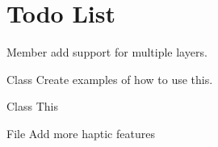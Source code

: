 \chapter{Todo List}
\hypertarget{todo}{}\label{todo}

\begin{DoxyRefList}
\item[Member \doxylink{class_atlas_1_1abstract_a7f6e5dc79241315ff8753e3ea3fbf3d2}{Atlas\+::abstract\texorpdfstring{$<$}{<} Console\+Sink \texorpdfstring{$>$}{>}\+::depth} ]\label{todo__todo000006}%
%
add support for multiple layers.  
\item[Class \doxylink{class_atlas_1_1_input_registry}{Atlas\+::Input\+Registry} ]\label{todo__todo000004}%
%
Create examples of how to use this.  
\item[Class \doxylink{class_atlas_1_1_localization_registry}{Atlas\+::Localization\+Registry} ]\label{todo__todo000005}%
%
This  
\item[File \doxylink{_common_8h}{Common.h} ]\label{todo__todo000001}%
%
Add more haptic features
\end{DoxyRefList}